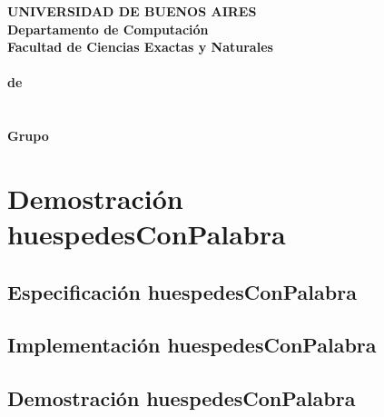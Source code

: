 \documentclass[a4paper]{article}
\begin{document}
\begin{center}
	{\textbf{\large UNIVERSIDAD DE BUENOS AIRES}}\\[1.5em]
	{\textbf{\large Departamento de Computaci\'{o}n}}\\[1.5em]
    {\textbf{\large Facultad de Ciencias Exactas y Naturales}}\\
    \vspace{20mm}
    {\LARGE\textbf{\Materia}}\\[1em]    
    \vspace{5mm}
    {\LARGE\textbf{\cuatrimestreLindo de \elanio}}\\
    \vspace{15mm}
    {\Large \textbf{\Titulo}}\\[1em]
    \vspace{15mm}
    {\textbf{\Large \Fecha}}\\
    \vspace{15mm}
    {\textbf{\Large Grupo \Grupo}}\\
    \vspace{10mm}
    \textbf{\tablaints}
\end{center}


\newpage

\tableofcontents
\medskip
\newpage
\section{Demostraci\'on huespedesConPalabra}

\subsection{Especificaci\'on huespedesConPalabra}



\subsection{Implementaci\'on huespedesConPalabra}



\subsection{Demostraci\'on huespedesConPalabra}
\end{document}
